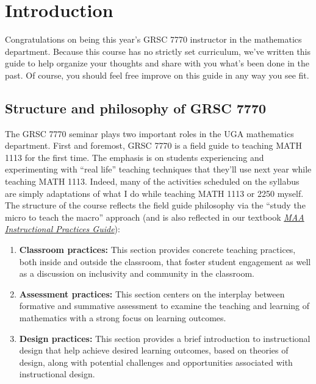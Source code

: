 
\section{Introduction}
\label{sec:introduction}

Congratulations on being this year's GRSC 7770 instructor in the mathematics department.  Because this course has no strictly set curriculum, we've written this guide to help organize your thoughts and share with you what's been done in the past.  Of course, you should feel free improve on this guide in any way you see fit.

\subsection{Structure and philosophy of GRSC 7770}
\label{sec:structure-course}

The GRSC 7770 seminar plays two important roles in the UGA mathematics department.  First and foremost, GRSC 7770 is a field guide to teaching MATH 1113 for the first time.  The emphasis is on students experiencing and experimenting with ``real life'' teaching techniques that they'll use next year while teaching MATH 1113.  Indeed, many of the activities scheduled on the syllabus are simply adaptations of what I do while teaching MATH 1113 or 2250 myself.  The structure of the course reflects the field guide philosophy via the ``study the micro to teach the macro'' approach (and is also reflected in our textbook \href{https://www.maa.org/sites/default/files/InstructPracGuide_web.pdf}{\emph{MAA Instructional Practices Guide}}):

\begin{enumerate}
\item \textbf{Classroom practices:}  This section provides concrete teaching practices, both inside and outside the classroom, that foster student engagement as well as a discussion on inclusivity and community in the classroom.
\item \textbf{Assessment practices:} This section centers on the interplay between formative and summative assessment to examine the teaching and learning of mathematics with a strong focus on learning outcomes.
\item \label{itm:DP} \textbf{Design practices:} This section provides a brief introduction to instructional design that help achieve desired learning outcomes, based on theories of design, along with potential challenges and opportunities associated with instructional design.
\end{enumerate}

